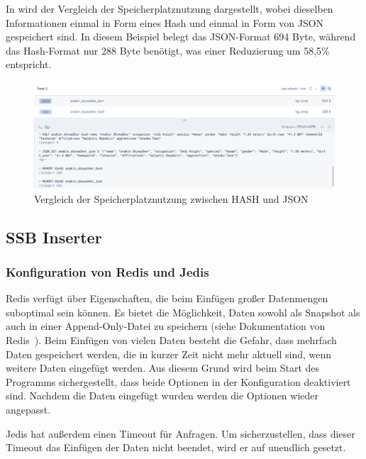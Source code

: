 In  wird der Vergleich der Speicherplatznutzung dargestellt, wobei dieselben Informationen einmal in Form eines Hash und einmal in Form von JSON gespeichert sind. In diesem Beispiel belegt das JSON-Format 694 Byte, während das Hash-Format nur 288 Byte benötigt, was einer Reduzierung um 58,5\% entspricht.
\begin{figure}[!h]  %
    \centering
    \includegraphics[width=1\textwidth]{pictures/redis/redis_hash_vs_json_memory.png}
    \caption{Vergleich der Speicherplatznutzung zwischen HASH und JSON}
    \label{pic:redis-hash-vs-json-memory}
\end{figure}

\subsection{SSB Inserter}\label{sec:ssb-inserter}

\subsubsection{Konfiguration von Redis und Jedis}
Redis verfügt über Eigenschaften, die beim Einfügen großer Datenmengen suboptimal sein können.
Es bietet die Möglichkeit, Daten sowohl als Snapshot als auch in einer Append-Only-Datei zu speichern (siehe Dokumentation von Redis~\cite{redis_ltd_persistence_nodate}).
Beim Einfügen von vielen Daten besteht die Gefahr, dass mehrfach Daten gespeichert werden, die in kurzer Zeit nicht mehr aktuell sind, wenn weitere Daten eingefügt werden. Aus diesem Grund wird beim Start des Programms sichergestellt, dass beide Optionen in der Konfiguration deaktiviert sind. Nachdem die Daten eingefügt wurden werden die Optionen wieder angepasst. 

Jedis hat außerdem einen Timeout für Anfragen. Um sicherzustellen, dass dieser Timeout das Einfügen der Daten nicht beendet, wird er auf unendlich gesetzt.

